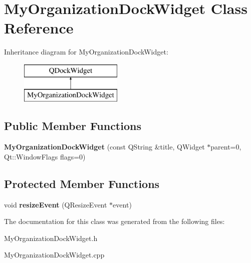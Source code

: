 \hypertarget{class_my_organization_dock_widget}{}\section{My\+Organization\+Dock\+Widget Class Reference}
\label{class_my_organization_dock_widget}
Inheritance diagram for My\+Organization\+Dock\+Widget\+:\begin{figure}[H]
\begin{center}
\leavevmode
\includegraphics[height=2.000000cm]{class_my_organization_dock_widget}
\end{center}
\end{figure}
\subsection*{Public Member Functions}
\begin{DoxyCompactItemize}
\item 
\hypertarget{class_my_organization_dock_widget_aac6c63cd09ef063f95872800c400666a}{}{\bfseries My\+Organization\+Dock\+Widget} (const Q\+String \&title, Q\+Widget $\ast$parent=0, Qt\+::\+Window\+Flags flags=0)\label{class_my_organization_dock_widget_aac6c63cd09ef063f95872800c400666a}

\end{DoxyCompactItemize}
\subsection*{Protected Member Functions}
\begin{DoxyCompactItemize}
\item 
\hypertarget{class_my_organization_dock_widget_ae2e820b68075f26923adc4b8ff972d1d}{}void {\bfseries resize\+Event} (Q\+Resize\+Event $\ast$event)\label{class_my_organization_dock_widget_ae2e820b68075f26923adc4b8ff972d1d}

\end{DoxyCompactItemize}


The documentation for this class was generated from the following files\+:\begin{DoxyCompactItemize}
\item 
My\+Organization\+Dock\+Widget.\+h\item 
My\+Organization\+Dock\+Widget.\+cpp\end{DoxyCompactItemize}
